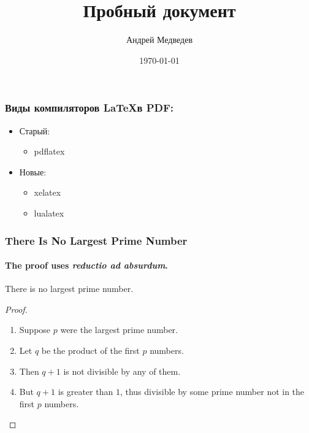 \documentclass{beamer}
\author{Андрей Медведев}
\title{Пробный документ}
\date{\today}
\institute{Кафедра ЭИ}
\begin{document}
\begin{frame}
	\titlepage
\end{frame}

\begin{frame}
	\frametitle{Виды компиляторов \LaTeX в PDF:}
\begin{itemize}
	\item Старый:
		\begin{itemize}
			\item pdflatex
		\end{itemize}
	\item Новые:
		\begin{itemize}
			\item xelatex
			\item lualatex
		\end{itemize}
\end{itemize}
\end{frame}

\begin{frame}
	\frametitle{There Is No Largest Prime Number}
	\framesubtitle{The proof uses \textit{reductio ad absurdum}.}
	\begin{theorem}
		There is no largest prime number.
	\end{theorem}
	\begin{proof}
		\begin{enumerate}
			\item<1-| alert@1> Suppose $p$ were the largest prime number.
			\item<2-> Let $q$ be the product of the first $p$ numbers.
			\item<3-> Then $q+1$ is not divisible by any of them.
			\item<1-> But $q + 1$ is greater than $1$, thus divisible by some prime
			number not in the first $p$ numbers.\qedhere
		\end{enumerate}
	\end{proof}
\end{frame}
\end{document}

